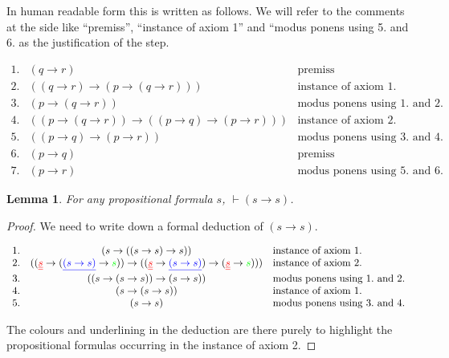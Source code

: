 \documentclass[11pt]{article}
\newtheorem{lemma}[theorem]{Lemma}
\begin{document}
In human readable form this is written as follows. We will refer to the comments at the side like ``premiss'', ``instance of axiom 1'' and ``modus ponens using 5. and 6. as the justification of the step.

\bigskip
$
\begin{array}{rcl}
  1. & (q\rightarrow r) & \text{premiss} \\
  2. & ((q\rightarrow r)\rightarrow (p\rightarrow (q\rightarrow r))) & \text{instance of axiom 1.} \\
  3. & (p\rightarrow (q\rightarrow r)) & \text{modus ponens using $1.$ and $2.$} \\
  4. & ((p\rightarrow(q\rightarrow r))\rightarrow ((p\rightarrow q)\rightarrow(p\rightarrow r))) & \text{instance of axiom 2.} \\
  5. & ((p\rightarrow q)\rightarrow (p\rightarrow r)) & \text{modus ponens using $3.$ and $4.$} \\
  6. & (p\rightarrow q) & \text{premiss} \\
  7. & (p\rightarrow r) & \text{modus ponens using $5.$ and $6.$}
\end{array}
$








\begin{lemma}\label{simpliess}
For any propositional formula $s$, $\vdash (s\rightarrow s)$.
\end{lemma}
\begin{proof}
We need to write down a formal deduction of $(s\rightarrow s)$.

\bigskip
$
\begin{array}{rcl}
  1. & (s\rightarrow((s\rightarrow s)\rightarrow s)) & \text{instance of axiom 1.} \\
  2. & (({\color{red}\underline{\underline{s}}}\rightarrow ({\color{blue}\underline{(s\rightarrow s)}}\rightarrow {\color{green}\uwave{s}}))\rightarrow (({\color{red}\underline{\underline{s}}}\rightarrow {\color{blue}\underline{(s\rightarrow s)}})\rightarrow ({\color{red}\underline{\underline{s}}}\rightarrow {\color{green}\uwave{s}}))) & \text{instance of axiom 2.} \\
  3. & ((s\rightarrow (s\rightarrow s))\rightarrow (s\rightarrow s)) & \text{modus ponens using $1.$ and $2.$} \\
  4. & (s\rightarrow (s\rightarrow s)) & \text{instance of axiom 1.} \\
  5. & (s\rightarrow s) & \text{modus ponens using $3.$ and $4.$}
\end{array}
$

The colours and underlining in the deduction are there purely to highlight the propositional formulas occurring in the instance of axiom 2.
\end{proof}
\end{document}
